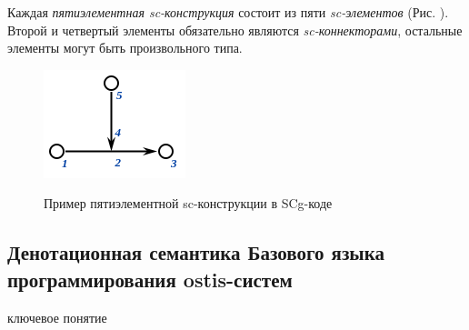 Каждая \textit{пятиэлементная sc-конструкция} состоит из пяти \textit{sc-элементов} (Рис. \textit{}). Второй и четвертый элементы обязательно являются \textit{sc-коннекторами}, остальные элементы могут быть произвольного типа.

\begin{figure}[H]
	\centering
	\caption{Пример пятиэлементной sc-конструкции в SCg-коде}
	\includegraphics[scale=0.8]{images/part3/chapter_situation_management/pic_ps4.png}
	\label{fig:pic_ps4}
\end{figure}

\subsection{Денотационная семантика Базового языка программирования ostis-систем}
\label{subsec_scp_denot}

\begin{SCn}
\begin{scnrelfromlist}{ключевое понятие}
\end{scnrelfromlist}
\end{SCn}


